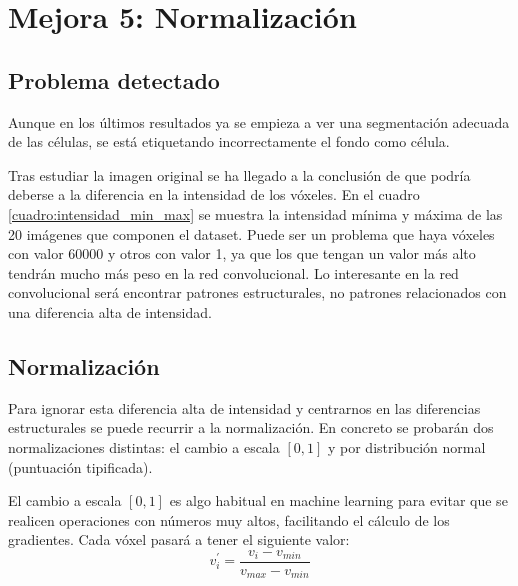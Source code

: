 \chapter{Mejora 5: Normalización}\label{znormalization}

\section{Problema detectado}\label{sec:znormalization_problem}

Aunque en los últimos resultados ya se empieza a ver una segmentación adecuada de las células, se está etiquetando incorrectamente el fondo como célula.

Tras estudiar la imagen original se ha llegado a la conclusión de que podría deberse a la diferencia en la intensidad de los vóxeles. En el cuadro \ref{cuadro:intensidad_min_max} se muestra la intensidad mínima y máxima de las 20 imágenes que componen el dataset. Puede ser un problema que haya vóxeles con valor 60000 y otros con valor 1, ya que los que tengan un valor más alto tendrán mucho más peso en la red convolucional. Lo interesante en la red convolucional será encontrar patrones estructurales, no patrones relacionados con una diferencia alta de intensidad.


\section{Normalización}\label{sec:normalization_techs}

Para ignorar esta diferencia alta de intensidad y centrarnos en las diferencias estructurales se puede recurrir a la normalización. En concreto se probarán dos normalizaciones distintas: el cambio a escala $[0,1]$ y por distribución normal (puntuación tipificada).

El cambio a escala $[0,1]$ es algo habitual en machine learning para evitar que se realicen operaciones con números muy altos, facilitando el cálculo de los gradientes. Cada vóxel pasará a tener el siguiente valor:
\begin{equation}
v_i^{'} = \frac{v_i - v_{min}}{v_{max}-v_{min}}
\end{equation}

